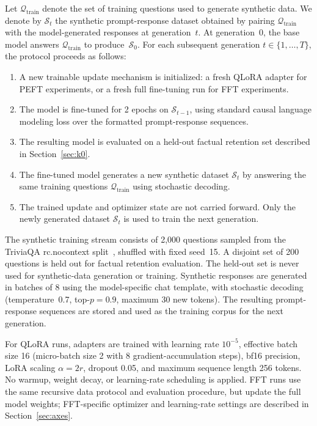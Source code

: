 \documentclass[a4paper,fleqn]{cas-dc}
\begin{document}
Let $\mathcal{Q}_{\mathrm{train}}$ denote the set of training questions used to
generate synthetic data. We denote by $\mathcal{S}_t$ the synthetic
prompt-response dataset obtained by pairing
$\mathcal{Q}_{\mathrm{train}}$ with the model-generated responses at
generation~$t$. At generation~0, the base model answers
$\mathcal{Q}_{\mathrm{train}}$ to produce~$\mathcal{S}_0$. For each subsequent
generation $t \in \{1,\ldots,T\}$, the protocol proceeds as follows:

\begin{enumerate}
    \item A new trainable update mechanism is initialized: a fresh QLoRA adapter
    for PEFT experiments, or a fresh full fine-tuning run for FFT experiments.
    \item The model is fine-tuned for 2 epochs on $\mathcal{S}_{t-1}$, using
    standard causal language modeling loss over the formatted prompt-response
    sequences.
    \item The resulting model is evaluated on a held-out factual retention set
    described in Section~\ref{sec:k0}.
    \item The fine-tuned model generates a new synthetic dataset
    $\mathcal{S}_t$ by answering the same training questions
    $\mathcal{Q}_{\mathrm{train}}$ using stochastic decoding.
    \item The trained update and optimizer state are not carried forward. Only
    the newly generated dataset $\mathcal{S}_t$ is used to train the next
    generation.
\end{enumerate}

The synthetic training stream consists of 2{,}000
questions sampled from the TriviaQA rc.nocontext split~\citep{joshi2017},
shuffled with fixed seed~15. A disjoint set of 200 questions is held out for
factual retention evaluation. The held-out set is never used for synthetic-data
generation or training. Synthetic responses are generated in batches of 8 using
the model-specific chat template, with stochastic decoding
(temperature~0.7, top-$p=0.9$, maximum 30 new tokens). The resulting
prompt-response sequences are stored and used as the training corpus for the
next generation.

For QLoRA runs, adapters are trained with learning rate $10^{-5}$, effective
batch size 16 (micro-batch size 2 with 8 gradient-accumulation steps), bf16
precision, LoRA scaling $\alpha=2r$, dropout 0.05, and maximum sequence length
256 tokens. No warmup, weight decay, or learning-rate
scheduling is applied. FFT runs use the same recursive data protocol and
evaluation procedure, but update the full model weights; FFT-specific optimizer
and learning-rate settings are described in Section~\ref{sec:axes}.
\end{document}
